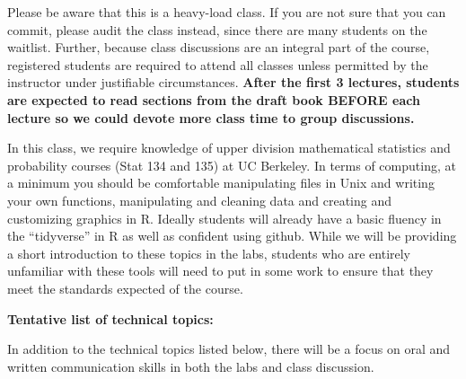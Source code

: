 \documentclass[11pt]{article}
\begin{document}
Please be aware that this is a heavy-load class. If you are not sure that you can commit, 
please audit the class instead, since there are many students on the waitlist. 
Further, because class discussions are an integral part of the course,
registered students are required to attend all classes unless permitted
by the instructor under justifiable circumstances. {\bf After the first
3 lectures, students are expected to read sections from the draft book 
BEFORE each lecture so we could devote more class time to group
discussions.} 

In this class, we require knowledge of upper division mathematical
statistics and probability courses (Stat 134 and 135) at UC Berkeley.  
In terms of computing, at a minimum you should be comfortable manipulating files in Unix and
writing your own functions, manipulating and cleaning data and
creating and customizing graphics in R. Ideally students will already have a basic fluency in the 
``tidyverse'' in R as well as confident using github. While we will be providing a short introduction to
these topics in the labs, students who are entirely unfamiliar with these tools will need to put in 
some work to ensure that they meet the standards expected of the course.\\


\newpage

{\bf Tentative list of technical topics:}

{\rm In addition to the technical topics listed below, there will be a focus on oral and written communication skills in both the labs and class discussion.}

\end{document}
